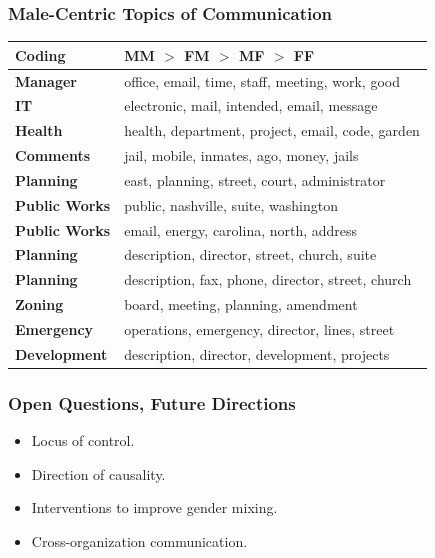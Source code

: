 \documentclass[xcolor={table}]{beamer}
\newcommand{\male}[1]{\colorbox{male}{#1}}
\newenvironment{changemargin}[2]{%
  \begin{list}{}{%
    \setlength{\topsep}{0pt}%
    \setlength{\leftmargin}{#1}%
    \setlength{\rightmargin}{#2}%
    \setlength{\listparindent}{\parindent}%
    \setlength{\itemindent}{\parindent}%
    \setlength{\parsep}{\parskip}%
  }%
  \item[]}{\end{list}}
\begin{document}
\begin{frame}\frametitle{Male-Centric Topics of Communication}
	
	
\begin{changemargin}{-.9cm}{ -1cm}	
	\centering
		\begin{tabular}{ll}
			\toprule
			Coding & MM $>$ FM $>$ MF $>$ FF\\
			\midrule

	\male{\textbf{Manager}} & office, email, time, staff, meeting, work, good\\ 

	\male{\textbf{IT}} & electronic, mail, intended, email, message\\ 

	\textbf{Health} & health, department, project, email, code, garden\\ 


	\textbf{Comments} & jail, mobile, inmates, ago, money, jails\\ 

	\male{\textbf{Planning}} & east, planning, street, court, administrator\\ 


	\male{\textbf{Public Works}} & public, nashville, suite, washington\\ 


	\male{\textbf{Public Works}} & email, energy, carolina, north, address\\ 


	\male{\textbf{Planning}} & description, director, street, church, suite\\ 


	\male{\textbf{Planning}} & description, fax, phone, director, street, church\\ 


	\male{\textbf{Zoning}} & board, meeting, planning, amendment\\ 


	\male{\textbf{Emergency}} & operations, emergency, director, lines, street\\ 


	\textbf{Development} & description, director, development, projects\\ 

			\bottomrule
		\end{tabular}
		\end{changemargin}
\end{frame}



\begin{frame}\frametitle{Open Questions, Future Directions}
	\LARGE
	\begin{itemize}
		\item Locus of control. 
		\vspace*{.3in}
		\item Direction of causality.
		\vspace*{.3in}
		\item Interventions to improve gender mixing. 
		\vspace*{.3in}
		\item Cross-organization communication.
	\end{itemize}
\end{frame}
\end{document}
